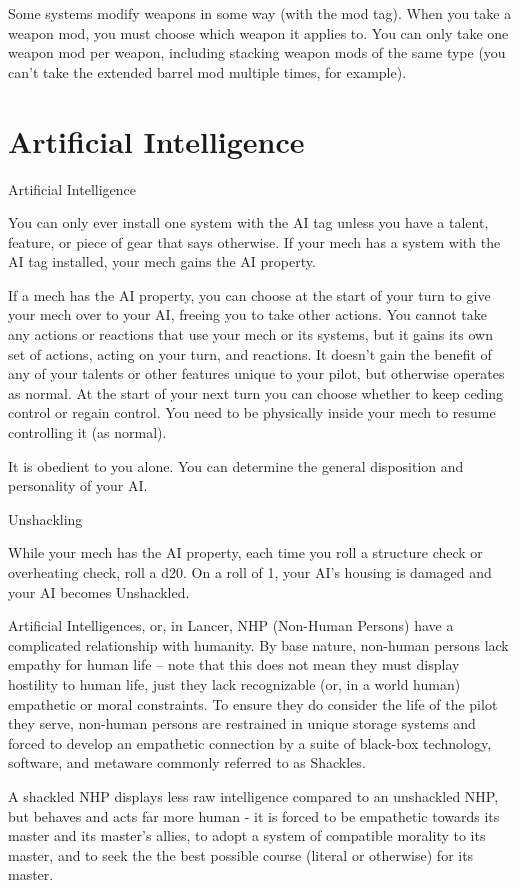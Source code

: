 Some systems modify weapons in some way (with the mod tag). When you take a weapon mod,
you must choose which weapon it applies to. You can only take one weapon mod per weapon,
including stacking weapon mods of the same type (you can’t take the extended barrel mod
multiple times, for example).
\section{Artificial Intelligence}
\hypertarget{AI}{Artificial Intelligence}

You can only ever install one system with the AI tag unless you have a talent, feature, or piece
of gear that says otherwise. If your mech has a system with the AI tag installed, your mech gains
the AI property.

If a mech has the AI property, you can choose at the start of your turn to give your mech over to
your AI, freeing you to take other actions. You cannot take any actions or reactions that use your
mech or its systems, but it gains its own set of actions, acting on your turn, and reactions. It
doesn’t gain the benefit of any of your talents or other features unique to your pilot, but
otherwise operates as normal. At the start of your next turn you can choose whether to keep
ceding control or regain control. You need to be physically inside your mech to resume
controlling it (as normal).


It is obedient to you alone. You can determine the general disposition and personality of your AI.

Unshackling

While your mech has the AI property, each time you roll a structure check or overheating
check, roll a d20. On a roll of 1, your AI’s housing is damaged and your AI becomes Unshackled.


Artificial Intelligences, or, in Lancer, NHP (Non-Human Persons) have a complicated relationship
with humanity. By base nature, non-human persons lack empathy for human life -- note that this
does not mean they must display hostility to human life, just they lack recognizable (or, in a world
human) empathetic or moral constraints. To ensure they do consider the life of the pilot they
serve, non-human persons are restrained in unique storage systems and forced to develop an
empathetic connection by a suite of black-box technology, software, and metaware commonly
referred to as Shackles.


A shackled NHP displays less raw intelligence compared to an unshackled NHP, but behaves
and acts far more human - it is forced to be empathetic towards its master and its master’s allies,
to adopt a system of compatible morality to its master, and to seek the the best possible course
(literal or otherwise) for its master.


